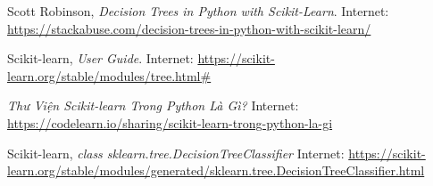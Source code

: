 \begin{thebibliography}{99}
\raggedright
Scott Robinson, \textit{Decision Trees in Python with Scikit-Learn}.
Internet: \url{https://stackabuse.com/decision-trees-in-python-with-scikit-learn/}

Scikit-learn, \textit{User Guide}.
Internet: \url{https://scikit-learn.org/stable/modules/tree.html\#}

\textit{Thư Viện Scikit-learn Trong Python Là Gì?}
Internet: \url{https://codelearn.io/sharing/scikit-learn-trong-python-la-gi}

Scikit-learn, \textit{class sklearn.tree.DecisionTreeClassifier}
Internet: \url{https://scikit-learn.org/stable/modules/generated/sklearn.tree.DecisionTreeClassifier.html}

\end{thebibliography}
